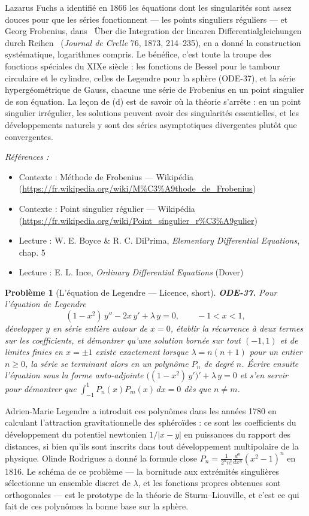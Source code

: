 \documentclass[11pt]{article}
\newtheorem{problem}{Problème}
\newenvironment{refs}{\par\small\noindent\emph{Références :}\begin{itemize}\setlength\itemsep{0pt}}{\end{itemize}\normalsize}
\begin{document}
\noindent Lazarus Fuchs a identifié en 1866 les équations dont les singularités sont
assez douces pour que les séries fonctionnent --- les points singuliers réguliers --- et Georg
Frobenius, dans \og{}~Über die Integration der linearen Differentialgleichungen durch
Reihen~\fg{} (\textit{Journal de Crelle} 76, 1873, 214--235), en a donné la construction
systématique, logarithmes compris. Le bénéfice, c'est toute la troupe des fonctions spéciales du
XIXe siècle : les fonctions de Bessel pour le tambour circulaire et le cylindre,
celles de Legendre pour la sphère (ODE-37), et la série hypergéométrique de Gauss, chacune une
série de Frobenius en un point singulier de son équation. La leçon de (d) est de savoir où la
théorie s'arrête : en un point singulier irrégulier, les solutions peuvent avoir des singularités
essentielles, et les développements naturels y sont des séries asymptotiques divergentes plutôt
que convergentes.

\begin{refs}
\item Contexte : Méthode de Frobenius --- Wikipédia (\url{https://fr.wikipedia.org/wiki/M%C3%A9thode_de_Frobenius})
\item Contexte : Point singulier régulier --- Wikipédia (\url{https://fr.wikipedia.org/wiki/Point_singulier_r%C3%A9gulier})
\item Lecture : W. E. Boyce \& R. C. DiPrima, \textit{Elementary Differential Equations}, chap. 5
\item Lecture : E. L. Ince, \textit{Ordinary Differential Equations} (Dover)
\end{refs}

\bigskip

\begin{problem}[{L'équation de Legendre --- Licence, short}]
\textbf{ODE-37.} Pour l'équation de Legendre
\[ (1 - x^2)\,y'' - 2x\,y' + \lambda\,y = 0, \qquad -1 < x < 1, \]
développer $ y $ en série entière autour de $ x = 0 $, établir la récurrence à deux termes sur
les coefficients, et démontrer qu'une solution bornée sur tout $ (-1, 1) $ et de limites finies
en $ x = \pm 1 $ existe exactement lorsque $ \lambda = n(n+1) $ pour un entier $ n \ge 0 $,
la série se terminant alors en un polynôme $ P_n $ de degré $ n $. Écrire ensuite l'équation
sous la forme auto-adjointe $ \big( (1-x^2)\,y' \big)' + \lambda\,y = 0 $ et s'en servir pour
démontrer que $ \int_{-1}^{1} P_n(x) P_m(x)\,dx = 0 $ dès que $ n \ne m $.
\end{problem}

\noindent Adrien-Marie Legendre a introduit ces polynômes dans les années 1780 en
calculant l'attraction gravitationnelle des sphéroïdes : ce sont les coefficients du développement
du potentiel newtonien $ 1/|x - y| $ en puissances du rapport des distances, si bien qu'ils sont
inscrits dans tout développement multipolaire de la physique. Olinde Rodrigues a donné la formule
close $ P_n = \frac{1}{2^n n!}\frac{d^n}{dx^n}(x^2-1)^n $ en 1816. Le schéma de ce problème --- la
bornitude aux extrémités singulières sélectionne un ensemble discret de $ \lambda $, et les
fonctions propres obtenues sont orthogonales --- est le prototype de la théorie de Sturm--Liouville,
et c'est ce qui fait de ces polynômes la bonne base sur la sphère.
\end{document}
